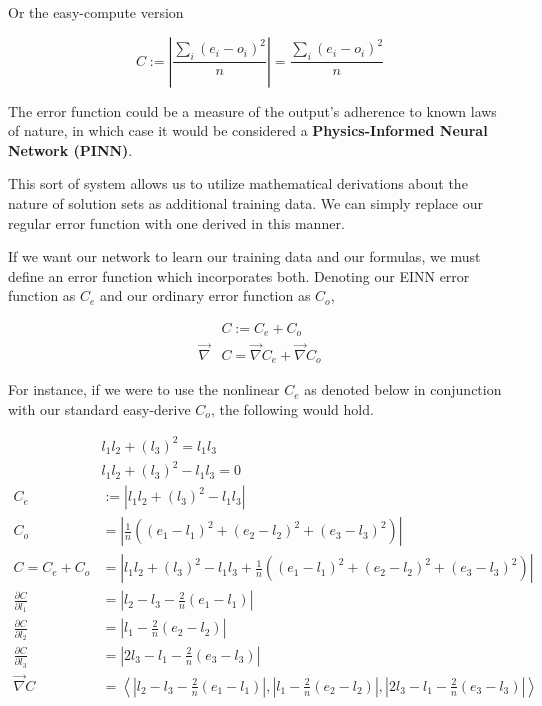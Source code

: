 \documentclass[8pt]{amsart}
\begin{document}
Or the easy-compute version

\[
    C := | \frac{\sum_i{(e_i - o_i)^2}}{n} | = \frac{\sum_i{(e_i - o_i)^2}}{n}
\]

The error function could be a measure of the output's adherence to known
laws of nature, in which case it would be considered a \textbf{Physics-Informed
Neural Network (PINN)}.

This sort of system allows us to utilize mathematical derivations about
the nature of solution sets as additional training data. We can simply replace
our regular error function with one derived in this manner.

If we want our network to learn our training data and our formulas, we must
define an error function which incorporates both. Denoting our EINN error
function as $C_e$ and our ordinary error function as $C_o$,

\[
\begin{aligned}
    &C := C_e + C_o \\
    \vec{\nabla} &C = \vec{\nabla}C_e + \vec{\nabla}C_o
\end{aligned}
\]

For instance, if we were to use the nonlinear $C_e$ as denoted below
in conjunction with our standard easy-derive $C_o$, the following would
hold.

\[
\begin{aligned}
    &l_1 l_2 + (l_3)^2 = l_1 l_3 \\
    &l_1 l_2 + (l_3)^2 - l_1 l_3 = 0 \\
    C_e &:= \left| l_1 l_2 + (l_3)^2 - l_1 l_3 \right| \\
    C_o &= \left| \frac{1}{n} \left( (e_1 - l_1)^2 + (e_2 - l_2)^2 + (e_3 - l_3)^2 \right) \right| \\
    C = C_e + C_o &= \left| l_1 l_2 + (l_3)^2 - l_1 l_3 + \frac{1}{n} \left( (e_1 - l_1)^2 + (e_2 - l_2)^2 + (e_3 - l_3)^2 \right) \right| \\
    \frac{\partial C}{\partial l_1} &= \left| l_2 - l_3 - \frac{2}{n}(e_1 - l_1) \right| \\
    \frac{\partial C}{\partial l_2} &= \left| l_1 - \frac{2}{n}(e_2 - l_2) \right| \\
    \frac{\partial C}{\partial l_3} &= \left| 2 l_3 - l_1 - \frac{2}{n}(e_3 - l_3) \right| \\
    \vec{\nabla} C &= \left< \left| l_2 - l_3 - \frac{2}{n}(e_1 - l_1) \right|, 
        \left| l_1 - \frac{2}{n}(e_2 - l_2) \right|,
        \left| 2 l_3 - l_1 - \frac{2}{n}(e_3 - l_3) \right| \right>
\end{aligned}
\]
\end{document}
